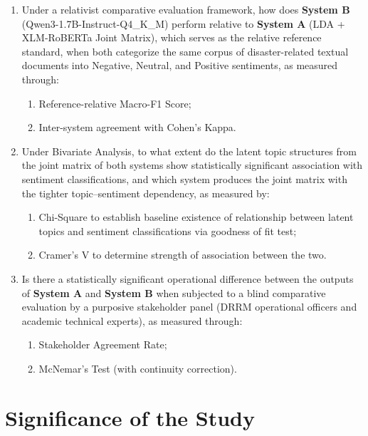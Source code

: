 \documentclass[12pt,a4paper]{report}
\newcommand{\sysA}{\textbf{System A}}
\newcommand{\sysB}{\textbf{System B}}
\newcommand{\xlmr}{XLM-RoBERTa}
\begin{document}
\begin{enumerate}[label=\arabic*.]
  \item Under a relativist comparative evaluation framework, how does \sysB{}
        (Qwen3-1.7B-Instruct-Q4\_K\_M) perform relative to \sysA{} (LDA + \xlmr{} Joint Matrix),
        which serves as the relative reference standard, when both categorize
        the same corpus of disaster-related textual documents into Negative,
        Neutral, and Positive sentiments, as measured through:
        \begin{enumerate}[label=\alph*.]
          \item Reference-relative Macro-F1 Score;
          \item Inter-system agreement with Cohen's Kappa.
        \end{enumerate}

  \item Under Bivariate Analysis, to what extent do the latent topic structures from the joint matrix of
        both systems show statistically significant association with sentiment
        classifications, and which system produces the joint matrix with the
        tighter topic--sentiment dependency, as measured by:
        \begin{enumerate}[label=\alph*.]
          \item Chi-Square to establish baseline existence of relationship between
          latent topics and sentiment classifications via goodness of fit test;
          \item Cramer's V to determine strength of association between the two.
        \end{enumerate}

  \item Is there a statistically significant operational difference between
        the outputs of \sysA{} and \sysB{} when subjected to a blind
        comparative evaluation by a purposive stakeholder panel (DRRM
        operational officers and academic technical experts), as measured
        through:
        \begin{enumerate}[label=\alph*.]
          \item Stakeholder Agreement Rate;
          \item McNemar's Test (with continuity correction).
        \end{enumerate}
\end{enumerate}

\section{Significance of the Study}
\end{document}
